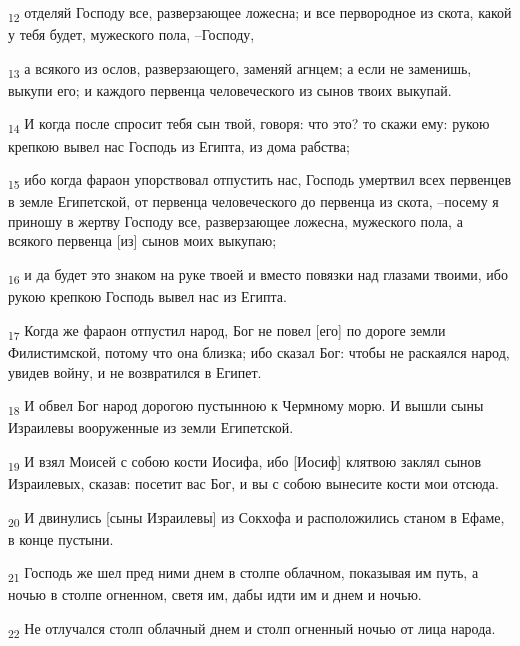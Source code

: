 \begin{tcolorbox}
\textsubscript{12} отделяй Господу все, разверзающее ложесна; и все первородное из скота, какой у тебя будет, мужеского пола, --Господу,
\end{tcolorbox}
\begin{tcolorbox}
\textsubscript{13} а всякого из ослов, разверзающего, заменяй агнцем; а если не заменишь, выкупи его; и каждого первенца человеческого из сынов твоих выкупай.
\end{tcolorbox}
\begin{tcolorbox}
\textsubscript{14} И когда после спросит тебя сын твой, говоря: что это? то скажи ему: рукою крепкою вывел нас Господь из Египта, из дома рабства;
\end{tcolorbox}
\begin{tcolorbox}
\textsubscript{15} ибо когда фараон упорствовал отпустить нас, Господь умертвил всех первенцев в земле Египетской, от первенца человеческого до первенца из скота, --посему я приношу в жертву Господу все, разверзающее ложесна, мужеского пола, а всякого первенца [из] сынов моих выкупаю;
\end{tcolorbox}
\begin{tcolorbox}
\textsubscript{16} и да будет это знаком на руке твоей и вместо повязки над глазами твоими, ибо рукою крепкою Господь вывел нас из Египта.
\end{tcolorbox}
\begin{tcolorbox}
\textsubscript{17} Когда же фараон отпустил народ, Бог не повел [его] по дороге земли Филистимской, потому что она близка; ибо сказал Бог: чтобы не раскаялся народ, увидев войну, и не возвратился в Египет.
\end{tcolorbox}
\begin{tcolorbox}
\textsubscript{18} И обвел Бог народ дорогою пустынною к Чермному морю. И вышли сыны Израилевы вооруженные из земли Египетской.
\end{tcolorbox}
\begin{tcolorbox}
\textsubscript{19} И взял Моисей с собою кости Иосифа, ибо [Иосиф] клятвою заклял сынов Израилевых, сказав: посетит вас Бог, и вы с собою вынесите кости мои отсюда.
\end{tcolorbox}
\begin{tcolorbox}
\textsubscript{20} И двинулись [сыны Израилевы] из Сокхофа и расположились станом в Ефаме, в конце пустыни.
\end{tcolorbox}
\begin{tcolorbox}
\textsubscript{21} Господь же шел пред ними днем в столпе облачном, показывая им путь, а ночью в столпе огненном, светя им, дабы идти им и днем и ночью.
\end{tcolorbox}
\begin{tcolorbox}
\textsubscript{22} Не отлучался столп облачный днем и столп огненный ночью от лица народа.
\end{tcolorbox}
